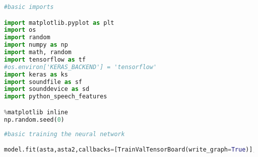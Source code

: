 \begin{lstlisting}[language=Python, label=lst:imports]
#basic imports

import matplotlib.pyplot as plt
import os
import random
import numpy as np
import math, random
import tensorflow as tf
#os.environ['KERAS_BACKEND'] = 'tensorflow'
import keras as ks
import soundfile as sf
import sounddevice as sd
import python_speech_features

%matplotlib inline
np.random.seed(0)
\end{lstlisting}

\begin{lstlisting}[language=Python, label=lst:training]
#basic training the neural network

model.fit(asta,asta2,callbacks=[TrainValTensorBoard(write_graph=True)],epochs=60,batch_size=20,validation_data=(valid1,valid2))
\end{lstlisting}

